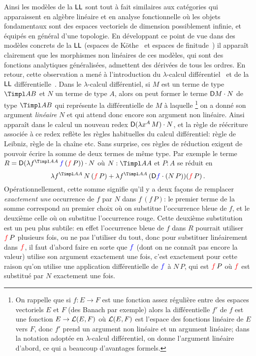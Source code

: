 \documentclass[a4]{article}
\begin{document}
Ainsi les modèles de la $\hbox{\textsf{LL}}$ sont tout à fait similaires aux
catégories qui apparaissent en algèbre linéaire et en analyse
fonctionnelle où les objets fondamentaux sont des espaces vectoriels
de dimension possiblement infinie, et équipés en général d'une
topologie.
%
En développant ce point de vue dans des modèles concrets de la $\hbox{\textsf{LL}}$
(espaces de Köthe~\cite{Ehrhard00c} et espaces de finitude~\cite{Ehrhard00b})
il apparaît clairement que les morphismes non linéaires de ces modèles, qui
sont des fonctions analytiques généralisées, admettent des dérivées de tous les
ordres.
%
En retour, cette observation a mené à l'introduction du
$\lambda$-calcul différentiel~\cite{EhrhardRegnier02} et de la $\hbox{\textsf{LL}}$
différentielle~\cite{EhrhardRegnier06d}.
%
Dans le $\lambda$-calcul différentiel, si $M$ est un terme de type
$\Timpl AB$ et $N$ un terme de type $A$, alors on peut former le terme
$\mathsf D{M}\cdot{N}$ de type $\Timpl AB$ qui représente la différentielle de
$M$ à laquelle%
\footnote{On rappelle que si $f:E\to F$ est une fonction assez
  régulière entre des espaces vectoriels $E$ et $F$ (des Banach par
  exemple) alors la différentielle $f'$ de $f$ est une fonction
  $E\to\mathcal{L}(E,F)$ où $\mathcal{L}(E,F)$ est l'espace des fonctions linéaire de
  $E$ vers $F$, donc $f'$ prend un argument non linéaire et un
  argument linéaire; dans la notation adoptée en $\lambda$-calcul
  différentiel, on donne l'argument linéaire d'abord, ce qui a
  beaucoup d'avantages formels.} %
on a donné son argument \emph{linéaire} $N$ et qui attend donc encore
son argument non linéaire.
%
Ainsi apparaît dans le calcul un nouveau redex
$\mathsf D{(\lambda x^{A}\,{M})}\cdot{N}$, et la règle de réécriture associée à ce
redex reflète les règles habituelles du calcul différentiel: règle de
Leibniz, règle de la chaîne etc.
%
Sans surprise, ces règles de réduction exigent de pouvoir écrire la
somme de deux termes de même type.
%
Par exemple le terme
$R=\Diffapp{(\Abst f{\Timpl AA}{\BL f\,(\RD f\,P)})}N$ où
$N:\Timpl AA$ et $P:A$ se réduit en
$$
\Abst f{\Timpl AA}{N\,(\RD f\, P)}
+
\Abst f{\Timpl AA}{(\Diffapp{\BL f}{(N\,P)})(\RD f\,P)}\,.
$$
Opérationnellement, cette somme signifie qu'il y a deux façons de
remplacer \emph{exactement une} occurrence de $f$ par $N$ dans
$f\,(f\, P)$: le premier terme de la somme correspond au premier choix
où on substitue l'occurrence bleue de $f$, et le deuxième celle où on
substitue l'occurrence rouge.
%
Cette deuxième substitution est un peu plus subtile: en effet
l'occurrence bleue de $f$ dans $R$ pourrait utiliser ${\color{red}f}\,P$
plusieurs fois, ou ne pas l'utiliser du tout, donc pour substituer
linéairement dans ${\color{red}f}$, il faut d'abord faire en sorte que ${\color{blue}f}$
(dont on ne connaît pas encore la valeur) utilise son argument
exactement une fois, c'est exactement pour cette raison qu'on utilise
une application différentielle de ${\color{blue}f}$ à $N\,P$, qui est ${\color{red}f}\,P$
où ${\color{red}f}$ est substitué par $N$ exactement une fois.
\end{document}
